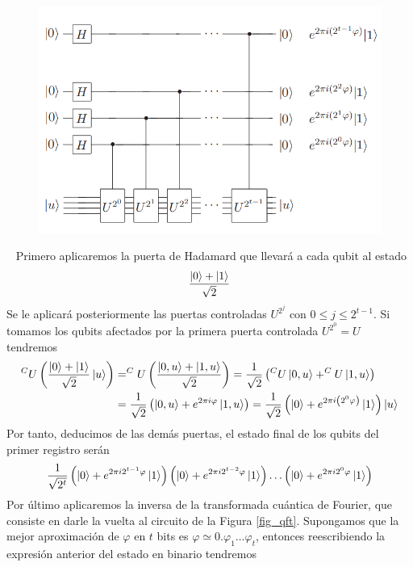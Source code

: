 \documentclass[a4paper]{article}
\numberwithin{equation}{section}
\begin{document}
\begin{figure}[h]
\centering
\includegraphics[scale=0.7]{orden}
\end{figure}\ \linebreak
Primero aplicaremos la puerta de Hadamard que llevará a cada qubit al estado
\begin{equation}
\frac{\ket{0} + \ket{1}}{\sqrt{2}}
\end{equation}
Se le aplicará posteriormente las puertas controladas $U^{2^j}$ con $0\leq j \leq 2^{t-1}$. Si tomamos los qubits afectados por la primera puerta controlada $U^{2^0} = U$ tendremos
\begin{equation}
\begin{split}
^CU \left( \frac{\ket{0} + \ket{1}}{\sqrt{2}} \ket{u} \right) 
&= 
^CU \left( \frac{\ket{0, u} + \ket{1, u}}{\sqrt{2}} \right)
=
\frac{1}{\sqrt{2}} \left( ^CU\ket{0, u} + ^CU\ket{1, u} \right)
\\ &=
\frac{1}{\sqrt{2}} \left( \ket{0, u} + e^{2\pi i \varphi}\ket{1, u} \right)
=
\frac{1}{\sqrt{2}} \left( \ket{0} + e^{2\pi i \left(2^0 \varphi\right)} \ket{1} \right) \ket{u}
\end{split}
\end{equation}
Por tanto, deducimos de las demás puertas, el estado final de los qubits del primer registro serán
\begin{equation}
\frac{1}{\sqrt{2^t}}
\left( \ket{0} + e^{2\pi i 2^{t-1}\varphi} \ket{1} \right)
\left( \ket{0} + e^{2\pi i 2^{t-2}\varphi} \ket{1} \right)
\ldots
\left( \ket{0} + e^{2\pi i 2^{0}\varphi} \ket{1} \right)
\end{equation}
Por último aplicaremos la inversa de la transformada cuántica de Fourier, que consiste en darle la vuelta al circuito de la Figura \ref{fig_qft}. Supongamos que la mejor aproximación de $\varphi$ en $t$ bits es $\varphi  \simeq 0.\varphi_1 \ldots \varphi_t$, entonces reescribiendo la expresión anterior del estado en binario tendremos
\end{document}
